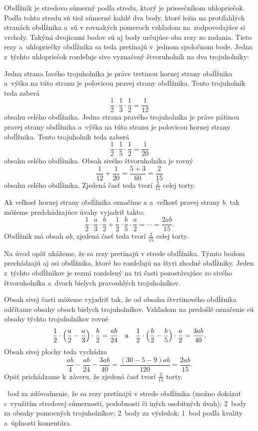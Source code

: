{%
Obdĺžnik je stredovo súmerný podľa stredu, ktorý je priesečníkom
uhlopriečok.
Podľa tohto stredu sú tiež súmerné každé dva body, ktoré ležia na
protiľahlých stranách obdĺžnika a~sú v rovnakých pomeroch vzhľadom na~zodpovedajúce si vrcholy.
Takými dvojicami bodov sú aj body určujúce oba rezy zo zadania.
Tieto rezy a~uhlopriečky obdĺžnika sa teda pretínajú v~jednom spoločnom bode.
Jedna z~týchto uhlopriečok rozdeľuje sivo vyznačený štvoruholník na dva trojuholníky:
%

Jedna strana ľavého trojuholníka je práve tretinou hornej strany
obdĺžnika a~výška na túto stranu je polovicou pravej strany obdĺžnika.
Tento trojuholník teda zaberá
$$
\frac12\cdot\frac13\cdot\frac12=\frac1{12}
$$
obsahu celého obdĺžnika.
Jedna strana pravého trojuholníka je práve pätinou pravej strany
obdĺžnika a~výška na túto stranu je polovicou hornej strany obdĺžnika.
Tento trojuholník teda zaberá
$$
\frac12\cdot\frac15\cdot\frac12=\frac1{20}
$$
obsahu celého obdĺžnika.
Obsah sivého štvoruholníka je rovný
$$
\frac1{12}+\frac1{20}=\frac{5+3}{60}=\frac2{15}
$$
obsahu celého obdĺžnika.
Zjedená časť teda tvorí $\frac2{15}$ celej torty.

\poznamka
Ak veľkosť hornej strany obdĺžnika označíme $a$ a~veľkosť pravej strany
$b$, tak môžeme predchádzajúce úvahy vyjadriť takto:
$$
\frac12\cdot\frac{a}3\cdot\frac{b}2+
\frac12\cdot\frac{b}5\cdot\frac{a}2=
\cdots
=\frac{2ab}{15}.
$$
Obdĺžnik má obsah $ab$, zjedená časť teda tvorí $\frac2{15}$ celej torty.

\ineriesenie
Na úvod opäť ukážeme, že sa rezy pretínajú v strede obdĺžnika.
Týmto bodom prechádzajú aj osi obdĺžnika, ktoré ho rozdeľujú na štyri zhodné
obdĺžniky.
Jeden z~týchto obdĺžnikov je rezmi rozdelený na tri časti pozostávajúce zo sivého
štvoruholníka a~dvoch bielych pravouhlých trojuholníkov.
%

Obsah sivej časti môžeme vyjadriť tak, že od obsahu štvrtinového obdĺžnika
odčítame obsahy oboch bielych trojuholníkov.
Vzhľadom na predošlé označenie sú obsahy týchto trojuholníkov rovné
$$
\frac12\cdot\left(\frac{a}2-\frac{a}3\right)\cdot\frac{b}2=\frac{ab}{24}
\quad\text{a}\quad
\frac12\cdot\Bigl(\frac{b}2-\frac{b}5\Bigr)\cdot\frac{a}2=\frac{3ab}{40}.
$$
Obsah sivej plochy teda vychádza
$$
\frac{ab}4-\frac{ab}{24}-\frac{3ab}{40}=\frac{(30-5-9)ab}{120}=\frac{2ab}{15}.
$$
Opäť prichádzame k~záveru, že zjedená časť tvorí $\frac2{15}$ torty.

~bod za zdôvodnenie, že sa rezy pretínajú v strede obdĺžnika
(možno dokázať s~využitím stredovej súmernosti, podobnosti či iných osobitných úvah);
2~body za obsahy pomocných trojuholníkov;
2~body za výsledok;
1~bod podľa kvality a~úplnosti komentára.
\endhodnotenie
}

